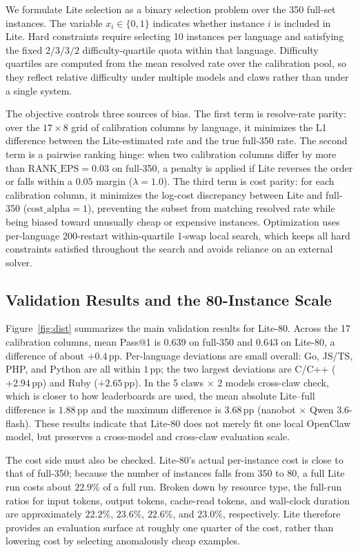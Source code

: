 \documentclass{llmxive}
\begin{document}
We formulate Lite selection as a binary selection problem over the 350 full-set instances. The variable $x_i\in\{0,1\}$ indicates whether instance $i$ is included in Lite. Hard constraints require selecting 10 instances per language and satisfying the fixed $2/3/3/2$ difficulty-quartile quota within that language. Difficulty quartiles are computed from the mean resolved rate over the calibration pool, so they reflect relative difficulty under multiple models and claws rather than under a single system.

The objective controls three sources of bias. The first term is resolve-rate parity: over the $17\times 8$ grid of calibration columns by language, it minimizes the L1 difference between the Lite-estimated rate and the true full-350 rate. The second term is a pairwise ranking hinge: when two calibration columns differ by more than $\textrm{RANK\_EPS}=0.03$ on full-350, a penalty is applied if Lite reverses the order or falls within a $0.05$ margin ($\lambda=1.0$). The third term is cost parity: for each calibration column, it minimizes the log-cost discrepancy between Lite and full-350 ($\textrm{cost\_alpha}=1$), preventing the subset from matching resolved rate while being biased toward unusually cheap or expensive instances. Optimization uses per-language 200-restart within-quartile 1-swap local search, which keeps all hard constraints satisfied throughout the search and avoids reliance on an external solver.

\subsection{Validation Results and the 80-Instance Scale}

Figure~\ref{fig:dist} summarizes the main validation results for Lite-80. Across the 17 calibration columns, mean Pass@1 is $0.639$ on full-350 and $0.643$ on Lite-80, a difference of about $+0.4$\,pp. Per-language deviations are small overall: Go, JS/TS, PHP, and Python are all within $1$\,pp; the two largest deviations are C/C++ ($+2.94$\,pp) and Ruby ($+2.65$\,pp). In the 5 claws $\times$ 2 models cross-claw check, which is closer to how leaderboards are used, the mean absolute Lite--full difference is $1.88$\,pp and the maximum difference is $3.68$\,pp (nanobot $\times$ Qwen 3.6-flash). These results indicate that Lite-80 does not merely fit one local OpenClaw model, but preserves a cross-model and cross-claw evaluation scale.

The cost side must also be checked. Lite-80's actual per-instance cost is close to that of full-350; because the number of instances falls from 350 to 80, a full Lite run costs about $22.9\%$ of a full run. Broken down by resource type, the full-run ratios for input tokens, output tokens, cache-read tokens, and wall-clock duration are approximately $22.2\%$, $23.6\%$, $22.6\%$, and $23.0\%$, respectively. Lite therefore provides an evaluation surface at roughly one quarter of the cost, rather than lowering cost by selecting anomalously cheap examples.
\end{document}
